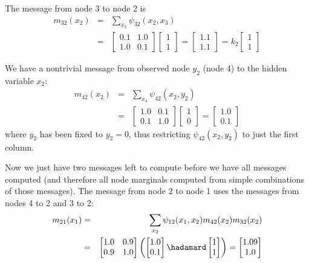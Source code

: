 The message from node 3 to node 2 is
\begin{eqnarray}
m_{32}(x_2) & = & \sum_{x_3} \psi_{32} (x_2, x_3) \nonumber  \\
& = & 
\begin{bmatrix}
0.1 & 1.0 \\
1.0 & 0.1 
\end{bmatrix}
\begin{bmatrix}
1 \\ 
1
\end{bmatrix}
=
\begin{bmatrix}
1.1 \\
1.1
\end{bmatrix}
=
k_2
\begin{bmatrix}
1 \\
1
\end{bmatrix}
\end{eqnarray}

We have a nontrivial message from observed node $y_2$ (node 4) to the hidden
variable $x_2$:
\begin{eqnarray}
m_{42}(x_2) & = & \sum_{x_4} \psi_{42} (x_2, y_2)  \nonumber \\
& = & 
\begin{bmatrix}
1.0 & 0.1 \\
0.1 & 1.0 
\end{bmatrix}
\begin{bmatrix}
1 \\
0
\end{bmatrix}
=
\begin{bmatrix}
1.0 \\
0.1
\end{bmatrix}
\end{eqnarray}
where $y_2$ has been fixed to $y_2 = 0$, thus restricting $\psi_{42}
(x_2, y_2) $ to just the first column.

Now we just have two messages left to compute before we have all
messages computed (and therefore all node marginals computed from
simple combinations of those messages).  
The message from node 2 to node 1 uses the messages from nodes 4 to 2
and 3 to 2:
\begin{eqnarray}
m_{21}(x_1) & = & \sum_{x_2} \psi_{12} (x_1, x_2)  m_{42}(x_2) m_{32}(x_2) \nonumber \\
& = & 
\begin{bmatrix}
1.0 & 0.9 \\
0.9 & 1.0 
\end{bmatrix}
\left(
\begin{bmatrix}
1.0 \\
0.1
\end{bmatrix}
\hadamard
\begin{bmatrix}
1 \\
1
\end{bmatrix}
\right)
=
\begin{bmatrix}
1.09 \\
1.0
\end{bmatrix}
\end{eqnarray}

